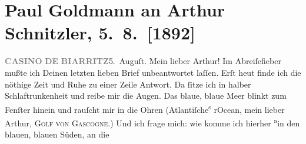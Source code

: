 

         
         \renewcommand{\erwaehntePersonen}{Personen: Richard Beer-Hofmann, Paul Goldmann, Fedor Mamroth}
         \renewcommand{\erwaehnteInstitutionen}{Institutionen: Casino de Biarritz}
         \renewcommand{\erwaehnteOrte}{Orte: Atlantischer Ozean, Biarritz, Biskaya, Café Pfob, Cauterets, Faberhäuser, Frankreich, Pau, Pyrenees, Salzburg, San Sebastian, Spanien, Wien}
         \renewcommand{\erwaehnteWerke}{Werke: Aus der Kaffeehausecke, Gespräch, welches in der Kaffeehausecke nach Vorlesung der »Elixiere« geführt wird, Tagebuch}
               \section[Paul Goldmann an Arthur Schnitzler, 5. 8. {[}1892{]}]{ Paul Goldmann an Arthur Schnitzler, 5. 8. {[}1892{]}}\nopagebreak{}\rehead{ }\begin{ledgroupsized}[t]{13cm}\normalsize\beginnumbering{} \toendnotes[C]{\smallbreak\pagebreak[2]} 
\toendnotes[C]{\smallbreak}\pstart
           \noindent{}{\pb}\textcolor{gray}{\textbf{CASINO}}\pend
           \pstart
           \textcolor{gray}{\textbf{DE}}\pend
           \pstart
           \textcolor{gray}{\textbf{BIARRITZ}}\hfill 5. Auguſt. \pend
           \pstart\center{}Mein lieber Arthur!\pend\pstart
           Im Abreiſefieber mußte ich Deinen letzten lieben Brief unbeantwortet laſſen. Erſt
                  heut finde ich die nöthige Zeit und Ruhe zu einer
               Zeile Antwort. Da ſitze ich in halber Schlaftrunkenheit und reibe mir die Augen. Das
               blaue, blaue Meer blinkt zum Fenſter hinein und rauſcht mir in die Ohren (Atlantiſche\substVorne{}\textsuperscript{s }\substDazwischen{}r\substHinten{}{ }{\pb}Ocean, mein lieber Arthur, \textsc{Golf von Gascogne}.) Und ich frage mich: wie  komme ich hierher \substVorne{}\textsuperscript{a}\substDazwischen{}in\substHinten{} den blauen, blauen Süden,  an die

\end{ledgroupsized}
